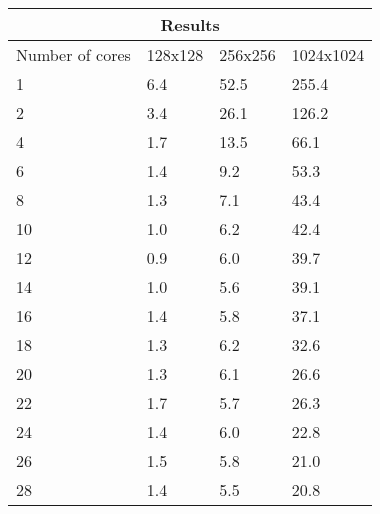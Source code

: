 \documentclass{article}
\begin{document}
\begin{multicols}{2}
\begin{center}
  \begin{tabular}{ |p{1.5cm}||p{1.5cm}|p{1.5cm}|p{1.5cm}| }
 \hline
 \multicolumn{4}{|c|}{Results} \\
 \hline
 Number of cores & 128x128 & 256x256 & 1024x1024 \\
 \hline
 1  & 6.4 &  52.5  &  255.4   \\
 2  & 3.4 &  26.1  &  126.2   \\
 4  & 1.7 &  13.5  &  66.1    \\ 
 6  & 1.4 &  9.2   &  53.3    \\ 
 8  & 1.3 &  7.1   &  43.4    \\ 
 10 & 1.0 &  6.2   &  42.4    \\
 12 & 0.9 &  6.0   &  39.7    \\
 14 & 1.0 &  5.6   &  39.1    \\ 
 16 & 1.4 &  5.8   &  37.1    \\ 
 18 & 1.3 &  6.2   &  32.6    \\
 20 & 1.3 &  6.1   &  26.6    \\
 22 & 1.7 &  5.7   &  26.3    \\ 
 24 & 1.4 &  6.0   &  22.8    \\ 
 26 & 1.5 &  5.8   &  21.0    \\ 
 28 & 1.4 &  5.5   &  20.8    \\
 \hline
\end{tabular}
\label{tab:parallelresults}
\end{center}

\end{multicols}
\end{document}
